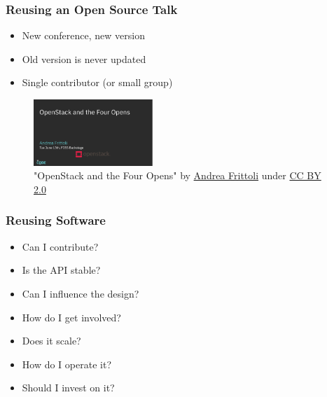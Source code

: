 \documentclass[aspectratio=169,11pt,hyperref={colorlinks=true}]{beamer}
\begin{document}
\begin{frame}
  \frametitle{Reusing an Open Source Talk}
    \begin{overlayarea}{\textwidth}{.3\textheight}
      \begin{itemize}
          \item{New conference, new version}
          \item{Old version is never updated}
          \item{Single contributor (or small group)}
      \end{itemize}
    \end{overlayarea}
    \begin{figure}
      \includegraphics[width=0.4\textwidth]{pictures/old_presentation.png}
         \caption{"OpenStack and the Four Opens" by \href{https://afrittoli.github.io/openstack-four-opens/}{Andrea Frittoli} under \href{https://creativecommons.org/licenses/by/2.0/}{CC BY 2.0}}
    \end{figure}
\end{frame}

\begin{frame}
  \frametitle{Reusing Software}
    \begin{itemize}
        \item{Can I contribute?}
        \item{Is the API stable?}
        \item{Can I influence the design?}
        \item{How do I get involved?}
        \item{Does it scale?}
        \item{How do I operate it?}
        \item{Should I invest on it?}
    \end{itemize}
\end{frame}

\end{document}
